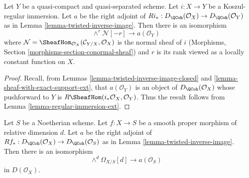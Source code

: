 \begin{lemma}
\label{lemma-regular-immersion}
Let $Y$ be a quasi-compact and quasi-separated scheme.
Let $i : X \to Y$ be a Koszul-regular immersion.
Let $a$ be the right adjoint of
$Ri_* : D_\QCoh(\mathcal{O}_X) \to D_\QCoh(\mathcal{O}_Y)$ as in
Lemma \ref{lemma-twisted-inverse-image}. Then there is an isomorphism
$$
\wedge^r\mathcal{N}[-r] \longrightarrow a(\mathcal{O}_Y)
$$
where
$\mathcal{N} = \SheafHom_{\mathcal{O}_X}(\mathcal{C}_{Y/X}, \mathcal{O}_X)$
is the normal sheaf of $i$
(Morphisms, Section \ref{morphisms-section-conormal-sheaf})
and $r$ is its rank viewed as a locally constant
function on $X$.
\end{lemma}

\begin{proof}
Recall, from Lemmas \ref{lemma-twisted-inverse-image-closed}
and \ref{lemma-sheaf-with-exact-support-ext},
that $a(\mathcal{O}_Y)$ is an object of $D_\QCoh(\mathcal{O}_X)$ whose
pushforward to $Y$ is
$R\SheafHom(i_*\mathcal{O}_X, \mathcal{O}_Y)$.
Thus the result follows from Lemma \ref{lemma-regular-immersion-ext}.
\end{proof}

\begin{lemma}
\label{lemma-smooth-proper}
Let $S$ be a Noetherian scheme.
Let $f : X \to S$ be a smooth proper morphism of relative dimension $d$.
Let $a$ be the right adjoint of
$Rf_* : D_\QCoh(\mathcal{O}_X) \to D_\QCoh(\mathcal{O}_S)$ as in
Lemma \ref{lemma-twisted-inverse-image}. Then there is an isomorphism
$$
\wedge^d \Omega_{X/S}[d] \longrightarrow a(\mathcal{O}_S)
$$
in $D(\mathcal{O}_X)$.
\end{lemma}

